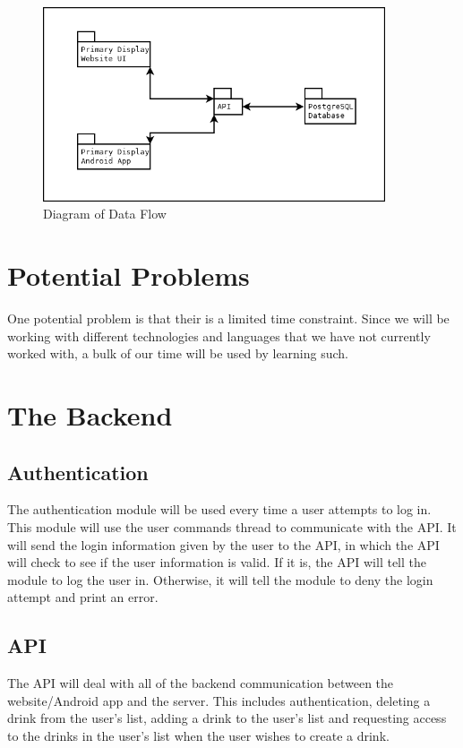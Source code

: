 {        \begin{figure}[htb]
            \centering
            \includegraphics[width=0.9\textwidth]{Images/DataFlow.png}
            \caption{Diagram of Data Flow}
            \label{fig:DataFlow}
        \end{figure}

    \section{Potential Problems}
        One potential problem is that their is a limited time constraint. 
        Since we will be working with different technologies and languages 
        that we have not currently worked with, a bulk of our time will be 
        used by learning such.

    \section{The Backend}

        \subsection{Authentication}
            The authentication module will be used every time a user attempts to 
            log in. This module will use the user commands thread to communicate 
            with the API. It will send the login information given by the user 
            to the API, in which the API will check to see if the user 
            information is valid. If it is, the API will tell the module to log 
            the user in. Otherwise, it will tell the module to deny the login 
            attempt and print an error.

        \subsection{API}
            The API will deal with all of the backend communication between the 
            website/Android app and the server. This includes authentication, 
            deleting a drink from the user's list, adding a drink to the user's 
            list and requesting access to the drinks in the user’s list when the 
            user wishes to create a drink.

}
